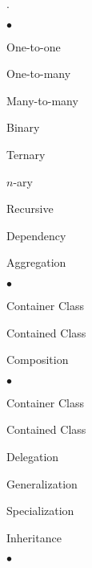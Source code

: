 \documentclass[11pt]{article}
\begin{document}
{\begin{list}{.}
\begin{list}{$\bullet$}{\itemsep 0.01in \parskip 0in \parsep 0in}
        \item One-to-one

        \item One-to-many

        \item Many-to-many

        \item Binary

        \item Ternary

        \item $n$-ary

        \item Recursive

        \item Dependency

        \item Aggregation

            \begin{list}{$\bullet$}{\itemsep 0.01in \parskip 0in \parsep 0in}

                \item Container Class

                \item Contained Class

            \end{list}

        \item Composition

            \begin{list}{$\bullet$}{\itemsep 0.01in \parskip 0in \parsep 0in}

                \item Container Class

                \item Contained Class

                \item Delegation

            \end{list}


        \item Generalization

        \item Specialization

        \item Inheritance

            \begin{list}{$\bullet$}{\itemsep 0.01in \parskip 0in \parsep 0in}


\end{list}
\end{list}
\end{list}}
\end{document}
